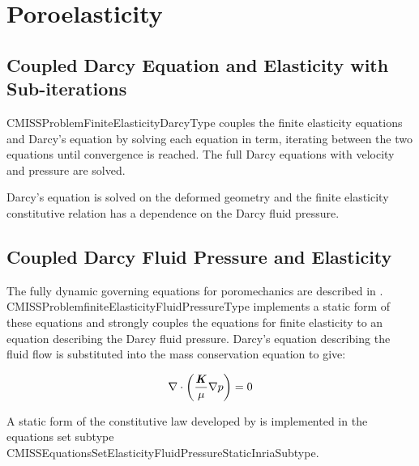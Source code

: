 \section{Poroelasticity}

\subsection{Coupled Darcy Equation and Elasticity with Sub-iterations}

CMISSProblemFiniteElasticityDarcyType couples the finite elasticity equations and
Darcy's equation by solving each equation in term, iterating between the two equations
until convergence is reached. The full Darcy equations with velocity and pressure
are solved.

Darcy's equation is solved on the deformed geometry and the finite elasticity
constitutive relation has a dependence on the Darcy fluid pressure.

\subsection{Coupled Darcy Fluid Pressure and Elasticity}

The fully dynamic governing equations for poromechanics are described in \cite{coussy:2004}.
CMISSProblemfiniteElasticityFluidPressureType implements a static form of these equations
and strongly couples the equations
for finite elasticity to an equation describing the Darcy fluid pressure. Darcy's
equation describing the fluid flow is substituted into the mass conservation
equation to give:

\begin{equation}
\divergence{}{\pbrac{\dfrac{\tensor{K}}{\mu} \gradient{}{p}}} = 0
\end{equation}

A static form of the constitutive law developed by \cite{chapelle:2010} is implemented in the equations
set subtype CMISSEquationsSetElasticityFluidPressureStaticInriaSubtype.
